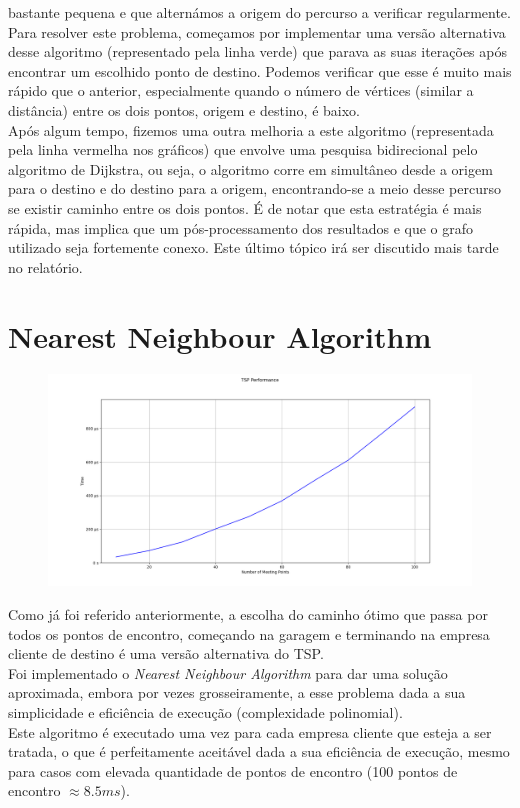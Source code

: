 \documentclass{report}
\begin{document}
    bastante pequena e que alternámos a origem do percurso a verificar regularmente.
    Para resolver este problema, começamos por implementar uma versão alternativa
    desse algoritmo (representado pela linha verde) que parava as suas iterações
    após encontrar um escolhido ponto de destino. Podemos verificar que esse é
    muito mais rápido que o anterior, especialmente quando o número de vértices
    (similar a distância) entre os dois pontos, origem e destino, é baixo.\\
    Após algum tempo, fizemos uma outra melhoria a este algoritmo (representada
    pela linha vermelha nos gráficos) que envolve uma pesquisa bidirecional pelo
    algoritmo de Dijkstra, ou seja, o algoritmo corre em simultâneo desde a origem
    para o destino e do destino para a origem, encontrando-se a meio desse percurso
    se existir caminho entre os dois pontos. É de notar que esta estratégia é mais
    rápida, mas implica que um pós-processamento dos resultados e que o grafo
    utilizado seja fortemente conexo. Este último tópico irá ser discutido mais
    tarde no relatório.

  \section{Nearest Neighbour Algorithm\cite{PSEUDONNA}}
    \begin{figure}[H]
      \centering
      \includegraphics[width=1.0\textwidth]{img/tsp_performance.png}
    \end{figure}
    Como já foi referido anteriormente, a escolha do caminho ótimo que passa por
    todos os pontos de encontro, começando na garagem e terminando na empresa
    cliente de destino é uma versão alternativa do TSP\cite{TSP}.\\
    Foi implementado o \textit{Nearest Neighbour Algorithm}\cite{PSEUDONNA} para
    dar uma solução aproximada, embora por vezes grosseiramente, a esse problema
    dada a sua simplicidade e eficiência de execução (complexidade polinomial).\\
    Este algoritmo é executado uma vez para cada empresa cliente que esteja a
    ser tratada, o que é perfeitamente aceitável dada a sua eficiência de execução,
    mesmo para casos com elevada quantidade de pontos de encontro
    (100 pontos de encontro $\approx 8.5ms$).
\end{document}
